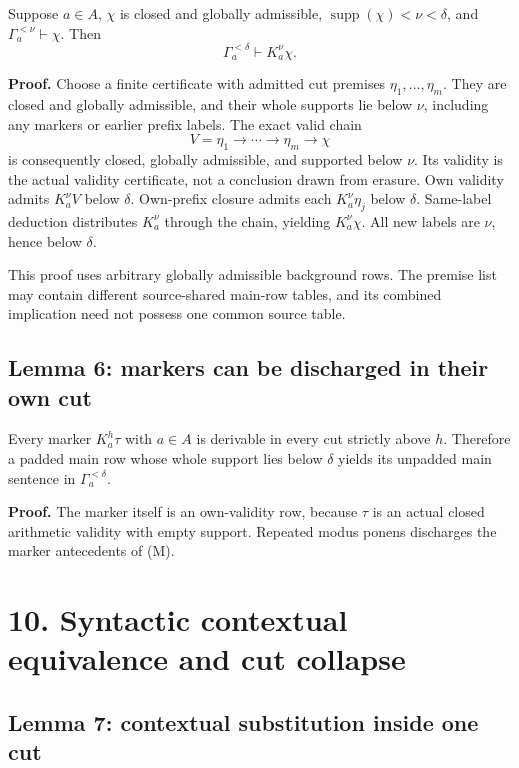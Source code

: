 \documentclass[
  11pt,
  letterpaper,
]{article}
\begin{document}
Suppose \(a\in A\), \(\chi\) is closed and globally admissible,
\(\operatorname{supp}(\chi)<\nu<\delta\), and
\(\Gamma_a^{<\nu}\vdash\chi\). Then \[
\Gamma_a^{<\delta}\vdash K_a^\nu\chi.
\]

\textbf{Proof.} Choose a finite certificate with admitted cut premises
\(\eta_1,\ldots,\eta_m\). They are closed and globally admissible, and
their whole supports lie below \(\nu\), including any markers or earlier
prefix labels. The exact valid chain \[
V=\eta_1\to\cdots\to\eta_m\to\chi
\] is consequently closed, globally admissible, and supported below
\(\nu\). Its validity is the actual validity certificate, not a
conclusion drawn from erasure. Own validity admits \(K_a^\nu V\) below
\(\delta\). Own-prefix closure admits each \(K_a^\nu\eta_j\) below
\(\delta\). Same-label deduction distributes \(K_a^\nu\) through the
chain, yielding \(K_a^\nu\chi\). All new labels are \(\nu\), hence below
\(\delta\).

This proof uses arbitrary globally admissible background rows. The
premise list may contain different source-shared main-row tables, and
its combined implication need not possess one common source table.

\subsection{Lemma 6: markers can be discharged in their own
cut}\label{lemma-6-markers-can-be-discharged-in-their-own-cut}

Every marker \(K_a^h\tau\) with \(a\in A\) is derivable in every cut
strictly above \(h\). Therefore a padded main row whose whole support
lies below \(\delta\) yields its unpadded main sentence in
\(\Gamma_a^{<\delta}\).

\textbf{Proof.} The marker itself is an own-validity row, because
\(\tau\) is an actual closed arithmetic validity with empty support.
Repeated modus ponens discharges the marker antecedents of (M).

\section{10. Syntactic contextual equivalence and cut
collapse}\label{syntactic-contextual-equivalence-and-cut-collapse}

\subsection{Lemma 7: contextual substitution inside one
cut}\label{lemma-7-contextual-substitution-inside-one-cut}
\end{document}
